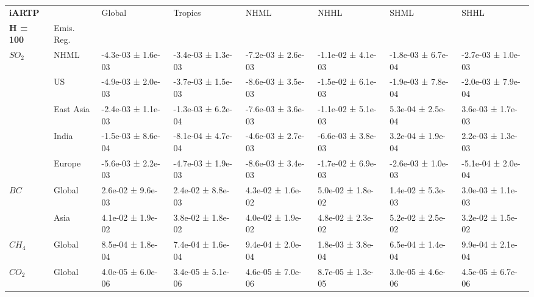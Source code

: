 \documentclass[preview]{standalone}
\newcommand{\nm}{\phantom{-}}
\begin{document}
	\tiny
	\begin{minipage}{\textwidth}
		\setlength\tabcolsep{5pt}
		\begin{tabular}{llllllll}
			\toprule
			\textbf{iARTP}       &        &               Global &              Tropics &                 NHML &                 NHHL &                 SHML &                 SHHL \\
			\textbf{H = 100}   & Emis. Reg. &                      &                      &                      &                      &                      &                      \\
			\midrule
$SO_2$ & NHML &  -4.3e-03 ±  1.6e-03 &  -3.4e-03 ±  1.3e-03 &  -7.2e-03 ±  2.6e-03 &  -1.1e-02 ±  4.1e-03 &  -1.8e-03 ±  6.7e-04 &  -2.7e-03 ±  1.0e-03 \\
       & US &  -4.9e-03 ±  2.0e-03 &  -3.7e-03 ±  1.5e-03 &  -8.6e-03 ±  3.5e-03 &  -1.5e-02 ±  6.1e-03 &  -1.9e-03 ±  7.8e-04 &  -2.0e-03 ±  7.9e-04 \\
       & East Asia &  -2.4e-03 ±  1.1e-03 &  -1.3e-03 ±  6.2e-04 &  -7.6e-03 ±  3.6e-03 &  -1.1e-02 ±  5.1e-03 &   \nm5.3e-04 ±  2.5e-04 &   \nm3.6e-03 ±  1.7e-03 \\
       & India &  -1.5e-03 ±  8.6e-04 &  -8.1e-04 ±  4.7e-04 &  -4.6e-03 ±  2.7e-03 &  -6.6e-03 ±  3.8e-03 &   \nm3.2e-04 ±  1.9e-04 &   \nm2.2e-03 ±  1.3e-03 \\
       & Europe &  -5.6e-03 ±  2.2e-03 &  -4.7e-03 ±  1.9e-03 &  -8.6e-03 ±  3.4e-03 &  -1.7e-02 ±  6.9e-03 &  -2.6e-03 ±  1.0e-03 &  -5.1e-04 ±  2.0e-04 \\
\cmidrule(lr){1-8}
$BC$ & Global &   \nm2.6e-02 ±  9.6e-03 &   \nm2.4e-02 ±  8.8e-03 &   \nm4.3e-02 ±  1.6e-02 &   \nm5.0e-02 ±  1.8e-02 &   \nm1.4e-02 ±  5.3e-03 &   \nm3.0e-03 ±  1.1e-03 \\
       & Asia &   \nm4.1e-02 ±  1.9e-02 &   \nm3.8e-02 ±  1.8e-02 &   \nm4.0e-02 ±  1.9e-02 &   \nm4.8e-02 ±  2.3e-02 &   \nm5.2e-02 ±  2.5e-02 &   \nm3.2e-02 ±  1.5e-02 \\
\cmidrule(lr){1-8}
$CH_4$ & Global &   \nm8.5e-04 ±  1.8e-04 &   \nm7.4e-04 ±  1.6e-04 &   \nm9.4e-04 ±  2.0e-04 &   \nm1.8e-03 ±  3.8e-04 &   \nm6.5e-04 ±  1.4e-04 &   \nm9.9e-04 ±  2.1e-04 \\
\cmidrule(lr){1-8}
$CO_2$ & Global &   \nm4.0e-05 ±  6.0e-06 &   \nm3.4e-05 ±  5.1e-06 &   \nm4.6e-05 ±  7.0e-06 &   \nm8.7e-05 ±  1.3e-05 &   \nm3.0e-05 ±  4.6e-06 &   \nm4.5e-05 ±  6.7e-06 \\
\bottomrule
\end{tabular}

        \end{minipage}
        
\end{document}
